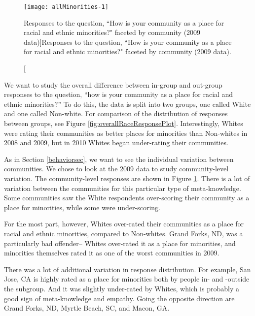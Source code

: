 \documentclass[smallextended]{svjour3}\usepackage[]{graphicx}\usepackage[]{color}
\newenvironment{knitrout}{}{} %
\begin{document}
\begin{knitrout}
\color{fgcolor}\begin{figure}

{\centering \texttt{[image: allMinorities-1]} 

}

\caption[Responses to the question, ``How is your community as a place for racial and ethnic minorities?" faceted by community (2009 data)]{Responses to the question, ``How is your community as a place for racial and ethnic minorities?" faceted by community (2009 data).}\label{fig:allMinorities}
\end{figure}


\end{knitrout}

We want to study the overall difference between in-group and out-group responses to the question, ``how is your community as a place for racial and ethnic minorities?'' To do this, the data is split into two groups, one called White and one called Non-white. For comparison of the distribution of responses between groups, see Figure \ref{fig:overallRaceResponsePlot}. Interestingly, Whites were rating their communities as better places for minorities than Non-whites in 2008 and 2009, but in 2010 Whites began under-rating their communities. 

As in Section \ref{behaviorsec}, we want to see the individual variation between communities. We chose to look at the 2009 data to study community-level variation. The community-level responses are shown in Figure \ref{fig:allMinorities}. There is a lot of variation between the communities for this particular type of meta-knowledge. Some communities saw the White respondents over-scoring their community as a place for minorities, while some were under-scoring. 

For the most part, however, Whites over-rated their communities as a place for racial and ethnic minorities, compared to Non-whites. Grand Forks, ND, was a particularly bad offender-- Whites over-rated it as a place for minorities, and minorities themselves rated it as one of the worst communities in 2009. 

There was a lot of additional variation in response distribution. For example, San Jose, CA is highly rated as a place for minorities both by people in- and -outside the subgroup. And it was slightly under-rated by Whites, which is probably a good sign of meta-knowledge and empathy. Going the opposite direction are Grand Forks, ND, Myrtle Beach, SC, and Macon, GA. 
\end{document}
